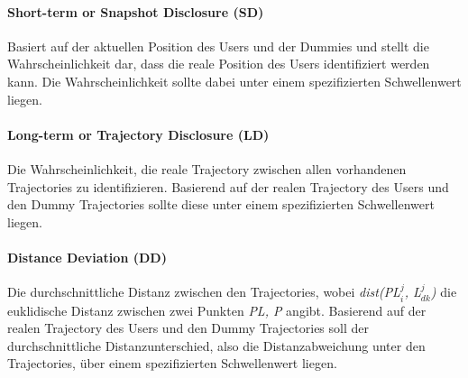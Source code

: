 	\paragraph{Short-term or Snapshot Disclosure (SD)} Basiert auf der aktuellen Position des Users und der Dummies und stellt die Wahrscheinlichkeit dar, dass die reale Position des Users identifiziert werden kann. Die Wahrscheinlichkeit sollte dabei unter einem spezifizierten Schwellenwert liegen. 
	
	\paragraph{Long-term or Trajectory Disclosure (LD)} Die Wahrscheinlichkeit, die reale Trajectory zwischen allen vorhandenen Trajectories zu identifizieren. Basierend auf der realen Trajectory des Users und den Dummy Trajectories sollte diese unter einem spezifizierten Schwellenwert liegen. 
	
	\paragraph{Distance Deviation (DD)} Die durchschnittliche Distanz zwischen den Trajectories, wobei \textit{dist(PL$_{i}^{j}$, L$_{dk}^{j}$)} die euklidische Distanz zwischen zwei Punkten \textit{PL, P} angibt. Basierend auf der realen Trajectory des Users und den Dummy Trajectories soll der durchschnittliche Distanzunterschied, also die Distanzabweichung unter den Trajectories, über einem spezifizierten Schwellenwert liegen.

